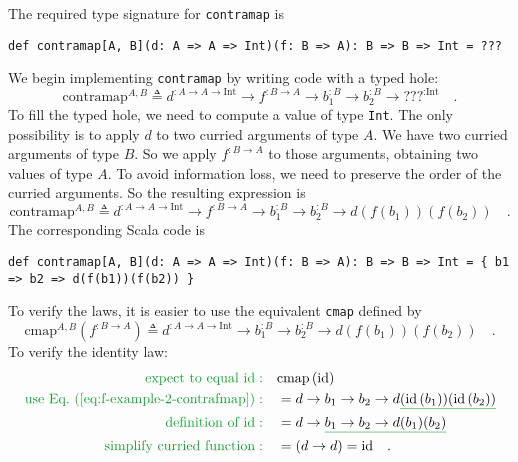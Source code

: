 The required type signature for \lstinline!contramap! is
\begin{lstlisting}
def contramap[A, B](d: A => A => Int)(f: B => A): B => B => Int = ???
\end{lstlisting}
We begin implementing \lstinline!contramap! by writing code with
a typed hole:
\[
\text{contramap}^{A,B}\triangleq d^{:A\rightarrow A\rightarrow\text{Int}}\rightarrow f^{:B\rightarrow A}\rightarrow b_{1}^{:B}\rightarrow b_{2}^{:B}\rightarrow\text{???}^{:\text{Int}}\quad.
\]
To fill the typed hole, we need to compute a value of type \lstinline!Int!.
The only possibility is to apply $d$ to two curried arguments of
type $A$. We have two curried arguments of type $B$. So we apply
$f^{:B\rightarrow A}$ to those arguments, obtaining two values of
type $A$. To avoid information loss, we need to preserve the order
of the curried arguments. So the resulting expression is
\[
\text{contramap}^{A,B}\triangleq d^{:A\rightarrow A\rightarrow\text{Int}}\rightarrow f^{:B\rightarrow A}\rightarrow b_{1}^{:B}\rightarrow b_{2}^{:B}\rightarrow d\left(f(b_{1})\right)\left(f(b_{2})\right)\quad.
\]
The corresponding Scala code is 
\begin{lstlisting}
def contramap[A, B](d: A => A => Int)(f: B => A): B => B => Int = { b1 => b2 => d(f(b1))(f(b2)) }
\end{lstlisting}
To verify the laws, it is easier to use the equivalent \lstinline!cmap!
defined by
\begin{equation}
\text{cmap}^{A,B}(f^{:B\rightarrow A})\triangleq d^{:A\rightarrow A\rightarrow\text{Int}}\rightarrow b_{1}^{:B}\rightarrow b_{2}^{:B}\rightarrow d\left(f(b_{1})\right)\left(f(b_{2})\right)\quad.\label{eq:f-example-2-contrafmap}
\end{equation}
To verify the identity law:
\begin{align*}
{\color{greenunder}\text{expect to equal }\text{id}:}\quad & \text{cmap}\left(\text{id}\right)\\
{\color{greenunder}\text{use Eq.~(\ref{eq:f-example-2-contrafmap})}:}\quad & =d\rightarrow b_{1}\rightarrow b_{2}\rightarrow d\gunderline{\left(\text{id}\,(b_{1})\right)}\gunderline{\left(\text{id}\,(b_{2})\right)}\\
{\color{greenunder}\text{definition of }\text{id}:}\quad & =d\rightarrow\gunderline{b_{1}\rightarrow b_{2}\rightarrow d(b_{1})(b_{2})}\\
{\color{greenunder}\text{simplify curried function}:}\quad & =\left(d\rightarrow d\right)=\text{id}\quad.
\end{align*}
